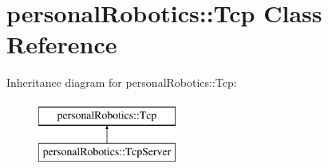 \hypertarget{classpersonal_robotics_1_1_tcp}{}\section{personal\+Robotics\+:\+:Tcp Class Reference}
\label{classpersonal_robotics_1_1_tcp}
Inheritance diagram for personal\+Robotics\+:\+:Tcp\+:\begin{figure}[H]
\begin{center}
\leavevmode
\includegraphics[height=2.000000cm]{de/dd4/classpersonal_robotics_1_1_tcp}
\end{center}
\end{figure}
